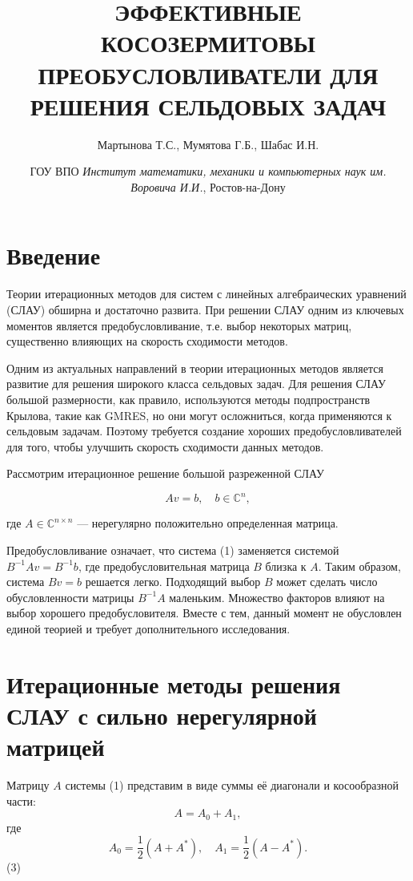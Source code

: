 \documentclass{article}
\begin{document}
\title{ЭФФЕКТИВНЫЕ КОСОЗЕРМИТОВЫ ПРЕОБУСЛОВЛИВАТЕЛИ ДЛЯ РЕШЕНИЯ СЕЛЬДОВЫХ ЗАДАЧ}
\author{Мартынова Т.С., Мумятова Г.Б., Шабас И.Н.}
\date{ГОУ ВПО \textit{Институт математики, механики и компьютерных наук им. Воровича И.И.}, Ростов-на-Дону}
\maketitle

\section*{Введение}

Теории итерационных методов для систем с линейных алгебраических уравнений (СЛАУ) обширна и достаточно развита. При решении СЛАУ одним из ключевых моментов является предобусловливание, т.е. выбор некоторых матриц, существенно влияющих на скорость сходимости методов.

Одним из актуальных направлений в теории итерационных методов является развитие для решения широкого класса сельдовых задач. Для решения СЛАУ большой размерности, как правило, используются методы подпространств Крылова, такие как GMRES, но они могут осложниться, когда применяются к сельдовым задачам. Поэтому требуется создание хороших предобусловливателей для того, чтобы улучшить скорость сходимости данных методов.

Рассмотрим итерационное решение большой разреженной СЛАУ

\[ Av = b, \quad b \in \mathbb{C}^n, \]

где \( A \in \mathbb{C}^{n \times n} \) — нерегулярно положительно определенная матрица.

Предобусловливание означает, что система (1) заменяется системой \( B^{-1}Av = B^{-1}b \), где предобусловительная матрица \( B \) близка к \( A \). Таким образом, система \( Bv = b \) решается легко. Подходящий выбор \( B \) может сделать число обусловленности матрицы \( B^{-1}A \) маленьким. Множество факторов влияют на выбор хорошего предобусловителя. Вместе с тем, данный момент не обусловлен единой теорией и требует дополнительного исследования.

\section{Итерационные методы решения СЛАУ с сильно нерегулярной матрицей}

Матрицу \(A\) системы (1) представим в виде суммы её диагонали и косообразной части:
\[ A = A_0 + A_1, \]
где
\[ A_0 = \frac{1}{2}(A + A^*), \quad A_1 = \frac{1}{2}(A - A^*). \] (3)
\end{document}
